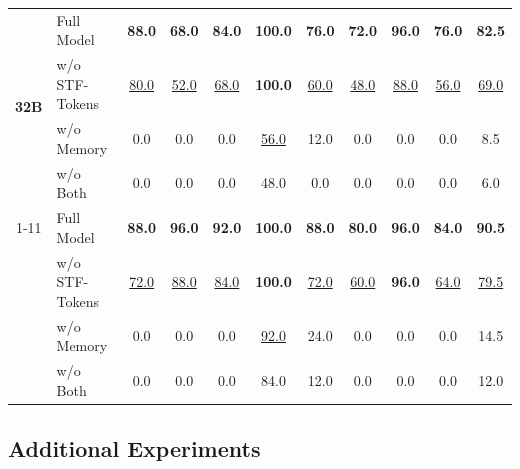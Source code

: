 \begin{table}[htbp]
{\begin{tabular}{c l c c c c c c c c c}
        \multirow{4}{*}{\textbf{32B}} 
        & Full Model & \textbf{88.0} & \textbf{68.0} & \textbf{84.0} & \textbf{100.0} & \textbf{76.0} & \textbf{72.0} & \textbf{96.0} & \textbf{76.0} & \textbf{82.5} \\
        & w/o STF-Tokens & \underline{80.0} & \underline{52.0} & \underline{68.0} & \textbf{100.0} & \underline{60.0} & \underline{48.0} & \underline{88.0} & \underline{56.0} & \underline{69.0} \\
        & w/o Memory & 0.0 & 0.0 & 0.0 & \underline{56.0} & 12.0 & 0.0 & 0.0 & 0.0 & 8.5 \\
        & w/o Both & 0.0 & 0.0 & 0.0 & 48.0 & 0.0 & 0.0 & 0.0 & 0.0 & 6.0 \\
        \cmidrule{1-11}
        
        \multirow{4}{*}{\textbf{235B}} 
        & Full Model & \textbf{88.0} & \textbf{96.0} & \textbf{92.0} & \textbf{100.0} & \textbf{88.0} & \textbf{80.0} & \textbf{96.0} & \textbf{84.0} & \textbf{90.5} \\
        & w/o STF-Tokens & \underline{72.0} & \underline{88.0} & \underline{84.0} & \textbf{100.0} & \underline{72.0} & \underline{60.0} & \textbf{96.0} & \underline{64.0} & \underline{79.5} \\
        & w/o Memory & 0.0 & 0.0 & 0.0 & \underline{92.0} & 24.0 & 0.0 & 0.0 & 0.0 & 14.5 \\
        & w/o Both & 0.0 & 0.0 & 0.0 & 84.0 & 12.0 & 0.0 & 0.0 & 0.0 & 12.0 \\
        
        \bottomrule
    \end{tabular}
    }
\end{table}

\subsection{Additional Experiments}
